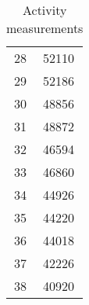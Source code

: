 \begin{table}[!htb]
\begin{tabular}{ cc }
		28 & 52110 \\
		29 & 52186 \\
		30 & 48856 \\
		31 & 48872 \\
		32 & 46594 \\
		33 & 46860 \\
		34 & 44926 \\
		35 & 44220 \\
		36 & 44018 \\
		37 & 42226 \\
		38 & 40920 
        \end{tabular}
        \caption{Activity measurements}\label{tab:act}
\end{table}



\
